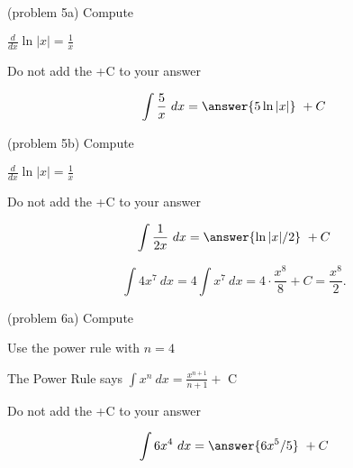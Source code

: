 \documentclass[handout]{ximera}
\begin{document}
\begin{problem}(problem 5a)
Compute

\begin{hint}
$\frac{d}{dx} \ln|x| = \frac{1}{x}$
\end{hint}
\begin{hint}
\begin{center}
Do not add the +C to your answer
\end{center}
\end{hint}

\[
\int \frac{5}{x} \ dx =
\answer{5\ln|x|} \ +  C
\]
\end{problem}

\begin{problem}(problem 5b)
Compute

\begin{hint}
$\frac{d}{dx} \ln|x| = \frac{1}{x}$
\end{hint}
\begin{hint}
\begin{center}
Do not add the +C to your answer
\end{center}
\end{hint}

\[
\int \frac{1}{2x} \ dx =
\answer{\ln|x| /2} \ +  C
\]
\end{problem}


\begin{example}[example 6]
\[
\int 4x^7 \ dx = 4 \int x^7 \ dx = 4\cdot \frac{x^8}{8} +C 
= \frac{x^8}{2}.
\]
\end{example}


\begin{problem}(problem 6a)
Compute 

\begin{hint}
Use the power rule with $n=4$
\end{hint}
\begin{hint}
The Power Rule says $\int x^n \ dx = \frac{x^{n+1}}{n+1} +$ C
\end{hint}
\begin{hint}
\begin{center}
Do not add the +C to your answer
\end{center}
\end{hint}

\[
\int 6x^4 \ dx =
\answer{6x^5 /5} \ + C
\]
\end{problem}
\end{document}
